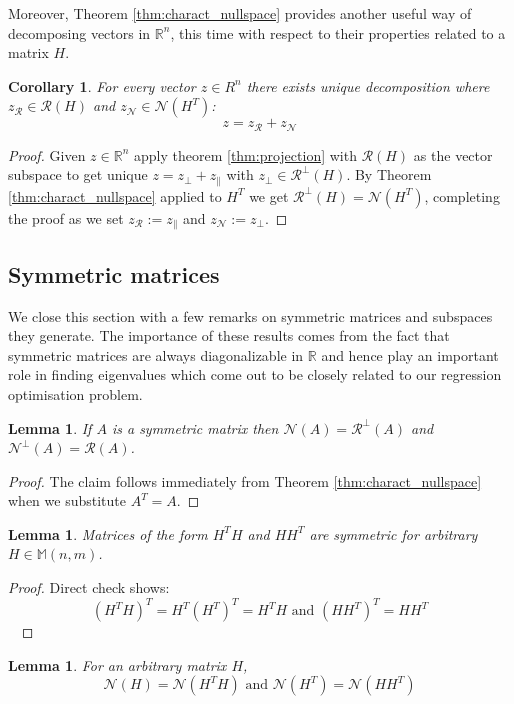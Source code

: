 \documentclass[a4paper]{article}
\theoremstyle{break}
\newtheorem{corollary}{Corollary}[theorem]
\newtheorem{lemma}[theorem]{Lemma}
\newcommand{\R}{\mathbb{R}}
\newcommand{\Nu}{\mathcal{N}}
\newcommand{\Ra}{\mathcal{R}}
\newcommand{\Mat}[2]{\mathbb{M}(#1, #2)}
\newcommand{\pll}{\parallel}
\begin{document}
Moreover, Theorem \ref{thm:charact_nullspace} provides another useful way of decomposing vectors in $\R^n$, this time with respect to their properties related to a matrix $H$.
\begin{corollary}
    For every vector $z \in R^n$ there exists unique decomposition where $z_\Ra \in \Ra(H)$ and $z_\Nu \in \Nu(H^T)$:
    $$z = z_\Ra + z_\Nu$$
\end{corollary}

\begin{proof}
    Given $ z \in \R^n$  apply theorem \ref{thm:projection} with $\Ra(H)$ as the vector subspace to get unique
    $ z = z_\perp + z_\pll$ with $z_\perp \in \Ra^\perp(H)$. By Theorem \ref{thm:charact_nullspace} applied to $H^T$ we get $\Ra^\perp(H) = \Nu(H^T)$, completing the proof as we set $z_\Ra := z_\pll$ and $z_\Nu := z_\perp$.
\end{proof}

\subsection{Symmetric matrices}
We close this section with a few remarks on symmetric matrices and subspaces they generate. The importance of these results comes from the fact that symmetric matrices are always diagonalizable in $\R$ and hence play an important role in finding eigenvalues which come out to be closely related to our regression optimisation problem. 

\begin{lemma} \label{lem:charact_sym_nullspace}
    If $A$ is a symmetric matrix then $\Nu(A) = \Ra^\perp(A)$ and $\Nu^\perp(A) = \Ra(A)$.
\end{lemma}
\begin{proof}
    The claim follows immediately from Theorem \ref{thm:charact_nullspace} when we substitute $A^T = A$.
\end{proof}

\begin{lemma}
Matrices of the form $H^T H$ and $H H^T$ are symmetric for arbitrary $H \in \Mat{n}{m}$.
\end{lemma}
\begin{proof}
    Direct check shows:
    $$(H^T H)^T = H^T (H^T)^T = H^T H \text{ and } (H H^T)^T = H H^T$$~
\end{proof}

\begin{lemma}
    \label{lem:nullspaces_hht}
    For an arbitrary matrix $H$,
    $$\Nu(H) = \Nu(H^T H) \text{ and } \Nu(H^T) = \Nu(H H^T)$$
\end{lemma}
\end{document}
